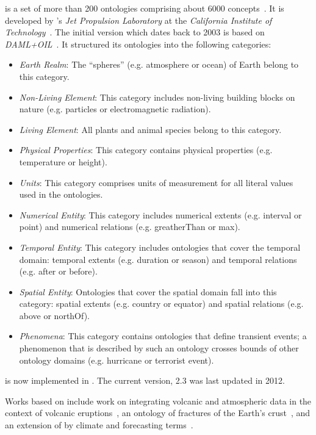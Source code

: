  is a set of more than 200 ontologies comprising about 6000 concepts~\cite{SWEET2,SWEETWeb}. It is developed by 's \emph{Jet Propulsion Laboratory} at the \emph{California Institute of Technology}~\cite{nasa-jpl}. The initial version which dates back to 2003 is based on \emph{DAML+OIL}~\cite{DAML+OIL,SWEET1}. It structured its ontologies into the following categories:
\begin{itemize}
  \item \emph{Earth Realm}: The ``spheres'' (e.g. atmosphere or ocean) of Earth belong to this category.
  \item \emph{Non-Living Element}: This category includes non-living building blocks on nature (e.g. particles or electromagnetic radiation).
  \item \emph{Living Element}: All plants and animal species belong to this category.
  \item \emph{Physical Properties}: This category contains physical properties (e.g. temperature or height).
  \item \emph{Units}: This category comprises units of measurement for all literal values used in the ontologies.
  \item \emph{Numerical Entity}: This category includes numerical extents (e.g. interval or point) and numerical relations (e.g. greatherThan or max).
  \item \emph{Temporal Entity}: This category includes ontologies that cover the temporal domain: temporal extents (e.g. duration or season) and temporal relations (e.g. after or before).
  \item \emph{Spatial Entity}: Ontologies that cover the spatial domain fall into this category: spatial extents (e.g. country or equator) and spatial relations (e.g. above or northOf).
  \item \emph{Phenomena}: This category contains ontologies that define transient events; a phenomenon that is described by such an ontology crosses bounds of other ontology domains (e.g. hurricane or terrorist event).
\end{itemize}

 is now implemented in . The current version,  2.3 was last updated in 2012.

Works based on  include work on integrating volcanic and atmospheric data in the context of volcanic eruptions~\cite{sweet_example1}, an ontology of fractures of the Earth's crust~\cite{sweet_example2}, and an extension of  by climate and forecasting terms~\cite{sweet_example3}.

